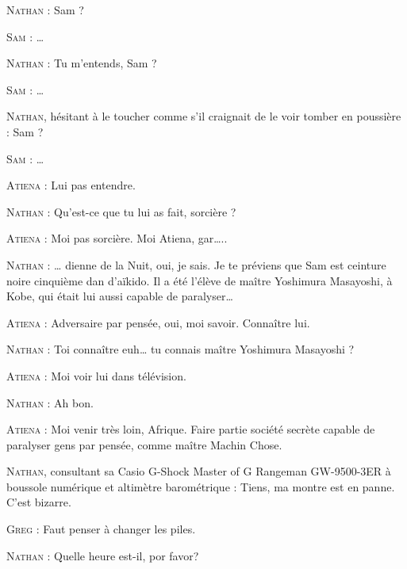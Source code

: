 \begin{dialogue}

\textsc{Nathan} : Sam ?

\textsc{Sam} : …

\textsc{Nathan} : Tu m’entends, Sam ?

\textsc{Sam} : …

\textsc{Nathan}, hésitant à le toucher comme s’il craignait de le voir tomber en poussière : Sam ?

\textsc{Sam} : …

\textsc{Atiena} : Lui pas entendre.

\textsc{Nathan} : Qu’est-ce que tu lui as fait, sorcière ?

\textsc{Atiena} : Moi pas sorcière. Moi Atiena, gar…..

\textsc{Nathan} : … dienne de la Nuit, oui, je sais. Je te préviens que Sam est ceinture noire cinquième dan d’aïkido. Il a été l’élève de maître Yoshimura Masayoshi, à Kobe, qui était lui aussi capable de paralyser…

\textsc{Atiena} : Adversaire par pensée, oui, moi savoir. Connaître lui.

\textsc{Nathan} : Toi connaître euh… tu connais maître Yoshimura Masayoshi ?

\textsc{Atiena} : Moi voir lui dans télévision.

%
%
\textsc{Nathan} : Ah bon.

\textsc{Atiena} : Moi venir très loin, Afrique. Faire partie société secrète capable de paralyser gens par pensée, comme maître Machin Chose.

\textsc{Nathan}, consultant sa Casio G-Shock Master of G Rangeman GW-9500-3ER à boussole numérique et altimètre barométrique : Tiens, ma montre est en panne. C’est bizarre.

\textsc{Greg} : Faut penser à changer les piles.

%
%
\textsc{Nathan} : Quelle heure est-il, \foreignlanguage{spanish}{por favor?}


\end{dialogue}
